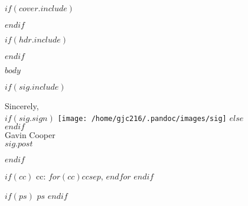 \documentclass[$size$]{article}
\newcommand{\coverpage}[0]{
	$if(cover.include)$
		
	$endif$
}
\newcommand{\header}[0]{
	$if(hdr.include)$
		
	$endif$
}
\begin{document}
\coverpage

\header

$body$

$if(sig.include)$
    \begin{minipage}[t]{6.5in}
    Sincerely,\\
    $if(sig.sign)$
        \vspace{-0.2in}\texttt{[image: /home/gjc216/.pandoc/images/sig]}
    $else$
        \\
    $endif$
    \\
    Gavin Cooper\\
    $sig.post$
    \end{minipage}
$endif$

$if(cc)$
    cc: $for(cc)$$cc$$sep$, $endfor$
$endif$

$if(ps)$
    $ps$
$endif$
\end{document}
